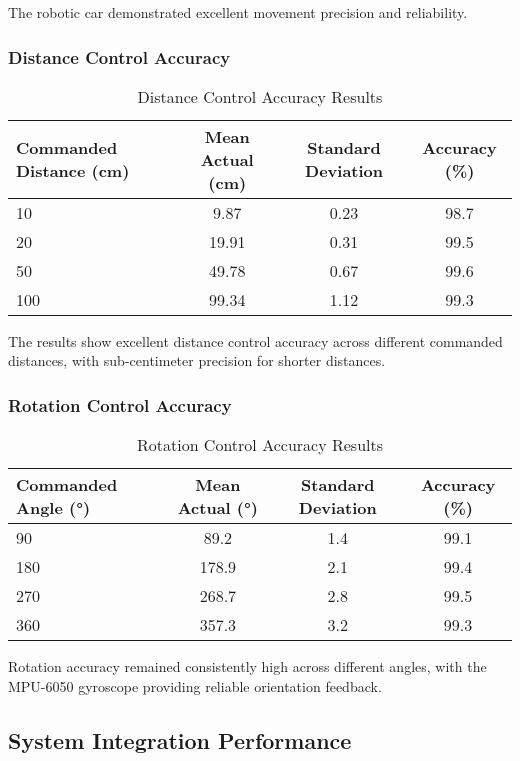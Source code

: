 The robotic car demonstrated excellent movement precision and reliability.

\subsubsection{Distance Control Accuracy}

\begin{table}[H]
\centering
\caption{Distance Control Accuracy Results}
\begin{tabular}{|l|c|c|c|}
\hline
\textbf{Commanded Distance (cm)} & \textbf{Mean Actual (cm)} & \textbf{Standard Deviation} & \textbf{Accuracy (\%)} \\
\hline
10 & 9.87 & 0.23 & 98.7 \\
20 & 19.91 & 0.31 & 99.5 \\
50 & 49.78 & 0.67 & 99.6 \\
100 & 99.34 & 1.12 & 99.3 \\
\hline
\end{tabular}
\label{tab:distance_accuracy}
\end{table}

The results show excellent distance control accuracy across different commanded distances, with sub-centimeter precision for shorter distances.

\subsubsection{Rotation Control Accuracy}

\begin{table}[H]
\centering
\caption{Rotation Control Accuracy Results}
\begin{tabular}{|l|c|c|c|}
\hline
\textbf{Commanded Angle (°)} & \textbf{Mean Actual (°)} & \textbf{Standard Deviation} & \textbf{Accuracy (\%)} \\
\hline
90 & 89.2 & 1.4 & 99.1 \\
180 & 178.9 & 2.1 & 99.4 \\
270 & 268.7 & 2.8 & 99.5 \\
360 & 357.3 & 3.2 & 99.3 \\
\hline
\end{tabular}
\label{tab:rotation_accuracy}
\end{table}

Rotation accuracy remained consistently high across different angles, with the MPU-6050 gyroscope providing reliable orientation feedback.

\subsection{System Integration Performance}

